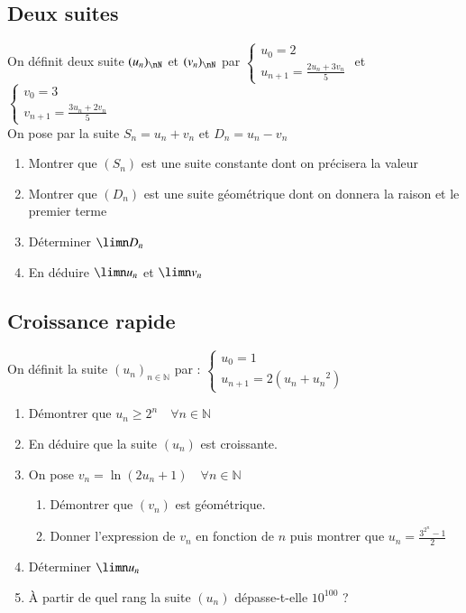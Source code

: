 \documentclass[oneside,12pt]{article}          %
\begin{document}
\subsection{Deux suites}
On définit deux suite $(u_n)_{\nN}$ et $(v_n)_{\nN}$ par $\begin{cases}u_0=2\\u_{n+1}=\frac{2u_n+3v_n}{5}\end{cases}$ et $\begin{cases}v_0=3\\v_{n+1}=\frac{3u_n+2v_n}{5}\end{cases}$\\
On pose par la suite $S_n=u_n+v_n$ et $D_n=u_n-v_n$
\begin{enumerate}
    \item Montrer que $(S_n)$ est une suite constante dont on précisera la valeur
    \item Montrer que $(D_n)$ est une suite géométrique dont on donnera la raison et le premier terme
    \item Déterminer $\limn D_n$
    \item En déduire $\limn u_n$ et $\limn v_n$
\end{enumerate}



\subsection{Croissance rapide}
On définit la suite $(u_n)_{n \in \mathbb{N}}$ par : $\begin{cases}u_0=1\\u_{n+1}=2\left(u_n+{u_n}^2\right)\end{cases}$
\begin{enumerate}
    \item Démontrer que $u_n \geq 2^n \quad \forall n \in \mathbb{N}$
    \item En déduire que la suite $(u_n)$ est croissante.
    \item On pose $v_n = \ln(2u_n + 1) \quad \forall n \in \mathbb{N}$
    \begin{enumerate}
        \item Démontrer que $(v_n)$ est géométrique.
        \item Donner l'expression de $v_n$ en fonction de $n$ puis montrer que $u_n=\frac{3^{2^n}-1}{2}$
    \end{enumerate}
    \item Déterminer $\limn u_n$
    \item À partir de quel rang la suite $(u_n)$ dépasse-t-elle $10^{100}$ ?
\end{enumerate}
\end{document}

